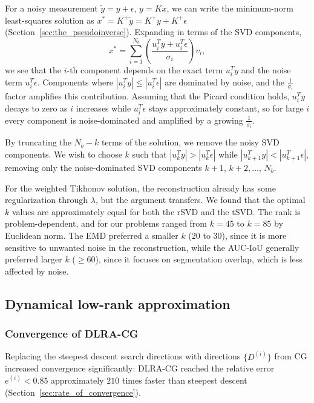 For a noisy measurement $\tilde y = y + \epsilon$, $y = K x$, we can write the minimum-norm least-squares solution as $x^* = K^+ \tilde y = K^+ y + K^+ \epsilon$ (Section~\ref{sec:the_pseudoinverse}). Expanding in terms of the SVD components,
\begin{equation*}
    x^* = \sum_{i=1}^{N_b}
    \left(\frac{u_i^T y + u_i^T \epsilon}{\sigma_i}\right) v_i,
\end{equation*}
we see that the $i$-th component depends on the exact term $u_i^T y$ and the noise term $u_i^T \epsilon$. Components where $|u_i^T y| \le |u_i^T \epsilon|$ are dominated by noise, and the $\tfrac{1}{\sigma_i}$ factor amplifies this contribution. Assuming that the Picard condition \cite{hansen2010discrete} holds, $u_i^T y$ decays to zero as $i$ increases while $u_i^T \epsilon$ stays approximately constant, so for large $i$ every component is noise-dominated and amplified by a growing $\tfrac{1}{\sigma_i}$.

By truncating the $N_b - k$ terms of the solution, we remove the noisy SVD components. We wish to choose $k$ such that $|u_k^T y| > |u_k^T \epsilon|$ while $|u_{k+1}^T y| < |u_{k+1}^T \epsilon|$, removing only the noise-dominated SVD components $k+1,\, k+2,\dots,\, N_b$.

For the weighted Tikhonov solution, the reconstruction already has some regularization through $\lambda$, but the argument transfers. We found that the optimal $k$ values are approximately equal for both the rSVD and the tSVD. The rank is problem-dependent, and for our problems ranged from $k = 45$ to $k = 85$ by Euclidean norm. The EMD preferred a smaller $k$ ($20$ to $30$), since it is more sensitive to unwanted noise in the reconstruction, while the AUC-IoU generally preferred larger $k$ ($\ge 60$), since it focuses on segmentation overlap, which is less affected by noise.


\subsection{Dynamical low-rank approximation}
\subsubsection{Convergence of DLRA-CG}\label{sec:convergence_of_DLRA_CG}
Replacing the steepest descent search directions with directions $\{D^{(i)}\}$ from CG increased convergence significantly: DLRA-CG reached the relative error $e^{(i)} < 0.85$ approximately $210$ times faster than steepest descent (Section~\ref{sec:rate_of_convergence}).

